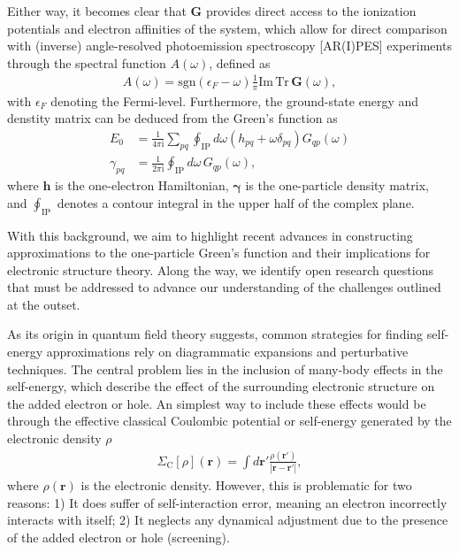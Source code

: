 \documentclass[aip,jcp,reprint,noshowkeys,superscriptaddress]{revtex4-2}
\newcommand{\bG}{\boldsymbol{G}}
\begin{document}
Either way, it becomes clear that $\bG$ provides direct access to the ionization potentials and electron affinities of the system, which allow for direct comparison with (inverse) angle-resolved photoemission spectroscopy [AR(I)PES] experiments through the spectral function $A(\omega)$, defined as
\begin{align}
    A(\omega) = \mathrm{sgn}(\epsilon_F - \omega) \frac{1}{\pi} \mathrm{Im} \, \mathrm{Tr} \, \bG(\omega),
\end{align}
with $\epsilon_F$ denoting the Fermi-level.
Furthermore, the ground-state energy and denstity matrix can be deduced from the Green's function as
\begin{align}
    E_0 &= \frac{1}{4 \pi \mathrm{i}} \sum_{pq} \oint_\mathrm{IP} d\omega \left(h_{pq} + \omega \delta_{pq} \right) G_{qp}(\omega) \\
    \gamma_{pq} &= \frac{1}{2 \pi \mathrm{i}} \oint_\mathrm{IP} d\omega \, G_{qp}(\omega),
\end{align}
where $\mathbf{h}$ is the one-electron Hamiltonian, $\boldsymbol{\gamma}$ is the one-particle density matrix, and $\oint_\mathrm{IP}$ denotes a contour integral in the upper half of the complex plane.

With this background, we aim to highlight recent advances in constructing approximations to the one-particle Green's function and their implications for electronic structure theory. 
Along the way, we identify open research questions that must be addressed to advance our understanding of the challenges outlined at the outset.

As its origin in quantum field theory suggests, common strategies for finding self-energy approximations rely on diagrammatic expansions and perturbative techniques.
The central problem lies in the inclusion of many-body effects in the self-energy, which describe the effect of the surrounding electronic structure on the added electron or hole.
An simplest way to include these effects would be through the effective classical Coulombic potential or self-energy generated by the electronic density $\rho$
\begin{align}
    \Sigma_\mathrm{C}[\rho](\mathbf{r}) = \int d\mathbf{r}' \frac{\rho(\mathbf{r}')}{|\mathbf{r} - \mathbf{r}'|}  ,
\end{align}
where $\rho(\mathbf{r})$ is the electronic density.
However, this is problematic for two reasons: 1) It does suffer of self-interaction error, meaning an electron incorrectly interacts with itself; 2) It neglects any dynamical adjustment due to the presence of the added electron or hole (screening).
\end{document}
